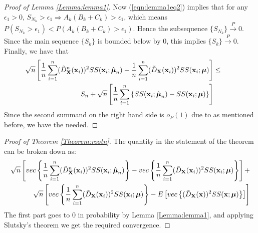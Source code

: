 \documentclass[fleqn,11pt]{article}
\begin{document}
\begin{proof}[Proof of Lemma \ref{Lemma:lemma1}]
Now (\ref{eqn:lemma1eq2}) implies that for any $\epsilon_1 > 0$, $S_{N_k} > \epsilon_1 \Rightarrow A_k (B_k + C_k) > \epsilon_1$, which means $ P(S_{N_k} > \epsilon_1) < P(A_k (B_k + C_k) > \epsilon_1)$. Hence the subsequence $\{S_{N_k}\} \stackrel{P}{\rightarrow} 0$. Since the main sequence $\{S_k\}$ is bounded below by 0, this implies $\{S_k\} \stackrel{P}{\rightarrow} 0$. Finally, we have that
%
\begin{eqnarray}
\sqrt n \left[
\frac{1}{n} \sum_{i=1}^n (\tilde D^n_{\mathbf{X}} ({\bf{x}}_i))^2 SS({\bf{x}}_i; \hat{{\boldsymbol{\mu}}}_n) -
\frac{1}{n} \sum_{i=1}^n (\tilde D_{\mathbf{X}} ({\bf{x}}_i))^2 SS({\bf{x}}_i; {\boldsymbol{\mu}}) \right] &\leq & \hspace{1em} \notag\\
S_n +  \sqrt{n} \left[ \frac{1}{n} \sum_{i=1}^{n} \left\{ SS({\bf{x}}_i; \hat{{\boldsymbol{\mu}}}_{n}) - SS({\bf{x}}_i; {\boldsymbol{\mu}}) \right\} \right] &&
\end{eqnarray}
%
Since the second summand on the right hand side is $o_P(1)$ due to \cite{durre14} as mentioned before, we have the needed.
\end{proof}

\begin{proof}[Proof of Theorem \ref{Theorem:rootn}]
The quantity in the statement of the theorem can be broken down as:
%
\begin{eqnarray*}
\sqrt n \left[ vec\left\{ \frac{1}{n} \sum_{i=1}^n (\tilde D^n_{\mathbf{X}} ({\bf{x}}_i))^2 SS({\bf{x}}_i; \hat{{\boldsymbol{\mu}}}_n) \right\} - vec\left\{ \frac{1}{n} \sum_{i=1}^n (\tilde D_{\mathbf{X}} ({\bf{x}}_i))^2 SS({\bf{x}}_i; {\boldsymbol{\mu}}) \right\} \right] +\\
\sqrt n \left[ vec\left\{ \frac{1}{n} \sum_{i=1}^n (\tilde D_{\mathbf{X}} ({\bf{x}}_i))^2 SS({\bf{x}}_i; {\boldsymbol{\mu}}) \right\} - E \left[ vec\left\{ (\tilde D_{\mathbf{X}} ({\bf{x}}))^2 SS({\bf{x}}; {\boldsymbol{\mu}}) \right\} \right] \right]
\end{eqnarray*}
%
The first part goes to 0 in probability by Lemma \ref{Lemma:lemma1}, and applying Slutsky's theorem we get the required convergence.
\end{proof}
\end{document}
